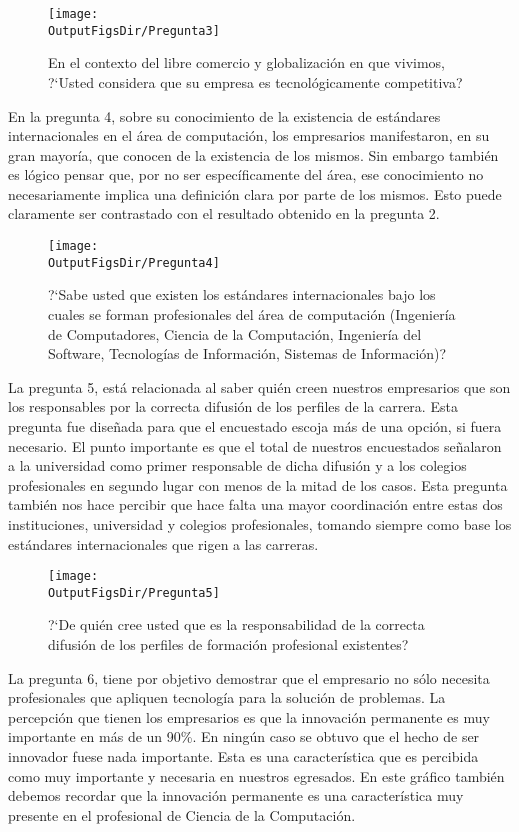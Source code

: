 \begin{figure}[!h]
	\centering
	\texttt{[image: \\OutputFigsDir/Pregunta3]}
	\label{fig:Preg3}
	\caption{En el contexto del libre comercio y globalización en que vivimos, ?`Usted considera que su empresa es tecnológicamente competitiva?}
\end{figure}

En la pregunta 4, sobre su conocimiento de la existencia de estándares internacionales en el área de computación, los empresarios manifestaron, en su gran mayoría, que conocen de la existencia de los mismos. Sin embargo también es lógico pensar que, por no ser específicamente del área, ese conocimiento no necesariamente implica una definición clara por parte de los mismos. Esto puede claramente ser contrastado con el resultado obtenido en la pregunta 2.


\begin{figure}[!h]
	\centering
	\texttt{[image: \\OutputFigsDir/Pregunta4]}
	\label{fig:Preg4}
	\caption{?`Sabe usted que existen los estándares internacionales bajo los cuales se forman profesionales del área de computación (Ingeniería de Computadores, Ciencia de la Computación, Ingeniería del Software, Tecnologías de Información, Sistemas de Información)?}
\end{figure}

La pregunta 5, está relacionada al saber quién creen nuestros empresarios que son los responsables por la correcta difusión de los perfiles de la carrera. Esta pregunta fue diseñada para que el encuestado escoja más de una opción, si fuera necesario. El punto importante es que el total de nuestros encuestados señalaron a la universidad como primer responsable de dicha difusión y a los colegios profesionales en segundo lugar con menos de la mitad de los casos. Esta pregunta también nos hace percibir que hace falta una mayor coordinación entre estas dos instituciones, universidad y colegios profesionales, tomando siempre como base los estándares internacionales que rigen a las carreras.

\begin{figure}[!h]
	\centering
	\texttt{[image: \\OutputFigsDir/Pregunta5]}
	\label{fig:Preg5}
	\caption{?`De quién cree usted que es la responsabilidad de la correcta difusión de los perfiles de formación profesional existentes?}
\end{figure}

La pregunta 6, tiene por objetivo demostrar que el empresario no sólo necesita profesionales que apliquen tecnología para la solución de problemas. La percepción que tienen los empresarios es que la innovación permanente es muy importante en más de un 90\%. En ningún caso se obtuvo que el hecho de ser innovador fuese nada importante. Esta es una característica que es percibida como muy importante y necesaria en nuestros egresados. En este gráfico también debemos recordar que la innovación permanente es una característica muy presente en el profesional de Ciencia de la Computación.

